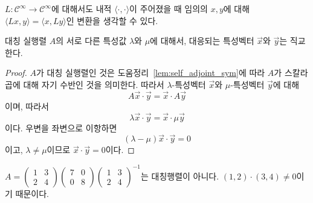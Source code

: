\documentclass[../engineering_mathematics_lecture_note.tex]{subfiles}
\begin{document}
\begin{remark}
    $L: \mathcal C^\infty \rightarrow \mathcal C^\infty$에 대해서도 내적 $\langle \cdot, \cdot \rangle$이 주어졌을 때 임의의 $x, y$에 대해 $\langle L x, y \rangle = \langle x, Ly \rangle$인 변환을 생각할 수 있다.
\end{remark}

\begin{theorem} \label{thm:sym_eigenvector_orthogonal}
    대칭 실행렬 $A$의 서로 다른 특성값 $\lambda$와 $\mu$에 대해서, 대응되는 특성벡터 $\vec x$와 $\vec y$는 직교한다.
\end{theorem}

\begin{proof}
    $A$가 대칭 실행렬인 것은 도움정리~\ref{lem:self_adjoint_sym}에 따라 $A$가 스칼라곱에 대해 자기 수반인 것을 의미한다.
    따라서 $\lambda$-특성벡터 $\vec x$와 $\mu$-특성벡터 $\vec y$에 대해
    \begin{equation*}
        A \vec x \cdot \vec y = \vec x \cdot A \vec y
    \end{equation*}
    이며, 따라서
    \begin{equation*}
        \lambda \vec x \cdot \vec y = \vec x \cdot \mu \vec y
    \end{equation*}
    이다.
    우변을 좌변으로 이항하면
    \begin{equation*}
        (\lambda - \mu) \vec x \cdot \vec y = 0
    \end{equation*}
    이고, $\lambda \neq \mu$이므로 $\vec x \cdot \vec y = 0$이다.
\end{proof}

\begin{example}
    $A = \begin{pmatrix}1 & 3\\2 & 4\end{pmatrix} \begin{pmatrix}7 & 0\\ 0 & 8\end{pmatrix}\begin{pmatrix}1 & 3\\2 & 4\end{pmatrix}^{-1}$는 대칭행렬이 아니다.
    $(1, 2) \cdot (3, 4) \neq 0$이기 때문이다.
\end{example}
\end{document}
